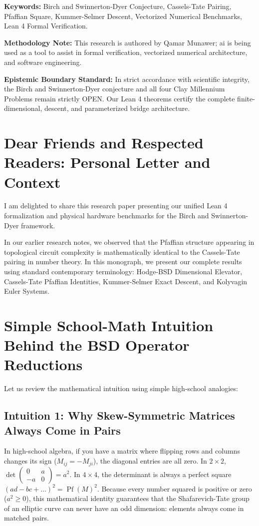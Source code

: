 \documentclass[11pt,a4paper]{article}
\theoremstyle{definition}
\begin{document}
\vspace{0.5em}
\noindent\textbf{Keywords:} Birch and Swinnerton-Dyer Conjecture, Cassels-Tate Pairing, Pfaffian Square, Kummer-Selmer Descent, Vectorized Numerical Benchmarks, Lean 4 Formal Verification.

\vspace{0.5em}
\noindent\textbf{Methodology Note:}
This research is authored by Qamar Munawer; ai is being used as a tool to assist in formal verification, vectorized numerical architecture, and software engineering.

\vspace{0.5em}
\noindent\textbf{Epistemic Boundary Standard:}
In strict accordance with scientific integrity, the Birch and Swinnerton-Dyer conjecture and all four Clay Millennium Problems remain strictly OPEN. Our Lean 4 theorems certify the complete finite-dimensional, descent, and parameterized bridge architecture.

\newpage

\section*{Dear Friends and Respected Readers: Personal Letter and Context}
I am delighted to share this research paper presenting our unified Lean 4 formalization and physical hardware benchmarks for the Birch and Swinnerton-Dyer framework.

In our earlier research notes, we observed that the Pfaffian structure appearing in topological circuit complexity is mathematically identical to the Cassels-Tate pairing in number theory. In this monograph, we present our complete results using standard contemporary terminology: Hodge-BSD Dimensional Elevator, Cassels-Tate Pfaffian Identities, Kummer-Selmer Exact Descent, and Kolyvagin Euler Systems.

\section{Simple School-Math Intuition Behind the BSD Operator Reductions}
Let us review the mathematical intuition using simple high-school analogies:

\subsection{Intuition 1: Why Skew-Symmetric Matrices Always Come in Pairs}
In high-school algebra, if you have a matrix where flipping rows and columns changes its sign ($M_{ij} = -M_{ji}$), the diagonal entries are all zero. In $2 \times 2$, $\det \begin{pmatrix} 0 & a \\ -a & 0 \end{pmatrix} = a^2$. In $4 \times 4$, the determinant is always a perfect square $(ad - bc + \dots)^2 = \operatorname{Pf}(M)^2$. Because every number squared is positive or zero ($a^2 \ge 0$), this mathematical identity guarantees that the Shafarevich-Tate group of an elliptic curve can never have an odd dimension: elements always come in matched pairs.
\end{document}

